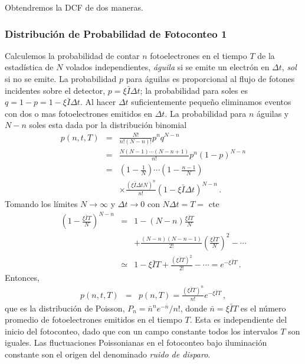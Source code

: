 \documentclass[twocolumn,aps,eqsecnum,showkeys,amsmath]{revtex4}
\begin{document}
Obtendremos la DCF de dos maneras.

\subsubsection{Distribuci\'on  de Probabilidad de Fotoconteo 1 
\label{sec:DPF1} } %
Calculemos la probabilidad de contar $n$ fotoelectrones en el tiempo 
$T$ de la estad\'istica de $N$ volados independientes, \textit{\'aguila} 
si se emite un electr\'on en $\Delta t$, \textit{sol} si no se emite. 
La probabilidad $p$ para \'aguilas es proporcional al flujo de fotones 
incidentes sobre el detector, $p=\xi \bar{I} \Delta t$; la 
probabilidad para soles es $q=1-p=1-\xi \bar{I} \Delta t$. Al hacer 
$\Delta t$ suficientemente peque\~no eliminamos eventos con dos o mas 
fotoelectrones emitidos en $\Delta t$. La probabilidad para $n$ 
\'aguilas y $N-n$ soles esta dada por la distribuci\'on binomial 
%
\begin{eqnarray*}
p(n,t,T) &=& \frac{N!}{n!(N-n)!} p^n q^{N-n}     \\ 
	&=& \frac{N(N-1) \cdots(N-n+1)}{n!} p^n (1-p)^{N-n} \\
&=& \left(1-\frac{1}{N} \right) \cdots \left(1-\frac{n-1}{N} \right) \\ 
	&& \times \frac{ (\xi \bar{I} \Delta t N)^n }{n!}
	(1- \xi \bar{I} \Delta t)^{N-n} \,.
\end{eqnarray*}
Tomando los l\'imites $N \to \infty$ y $\Delta t \to 0$ con 
$N \Delta t =T =$ cte 
%
\begin{eqnarray*}
(1- \frac{\xi \bar{I} T}{N})^{N-n} 
&=& 1-(N-n)\frac{\xi \bar{I} T}{N} \\ 
  && +\frac{(N-n)(N-n-1)}{2!} \left(\frac{\xi \bar{I} T}{N} \right)^2 
	-\cdots \\
&\simeq& 1- \xi \bar{I} T +\frac{(\xi \bar{I} T)^2}{2!} -\cdots 
	=e^{-\xi \bar{I} T } \,.
\end{eqnarray*}
Entonces, 
%
\begin{eqnarray}
p(n,t,T) &=& p(n,T) 
	=\frac{(\xi \bar{I} T)^n}{n!} e^{-\xi \bar{I} T } \,,
\end{eqnarray}
que es la distribuci\'on de Poisson, $P_n =\bar{n}^n e^{-\bar{n}}/n!$, 
donde $\bar{n}= \xi \bar{I} T$ es el n\'umero promedio de 
fotoelectrones emitidos en el tiempo $T$. Esta es independiente 
del inicio del fotoconteo, dado que con un campo constante todos 
los intervalos $T$ son iguales. Las fluctuaciones Poissonianas en 
el fotoconteo bajo iluminaci\'on constante son el origen del 
denominado \textit{ruido de disparo}.
 
\end{document}
